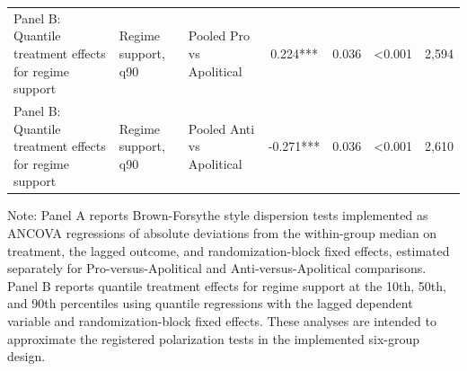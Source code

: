 \begin{table}[H]
\begin{threeparttable}
\begin{tabular}{lllcccc}
Panel B: Quantile treatment effects for regime support & Regime support, q90 & Pooled Pro vs Apolitical & 0.224*** & 0.036 & <0.001 & 2,594 \\
Panel B: Quantile treatment effects for regime support & Regime support, q90 & Pooled Anti vs Apolitical & -0.271*** & 0.036 & <0.001 & 2,610 \\
\bottomrule
\end{tabular}
\begin{tablenotes}[flushleft]
\footnotesize
\item Note: Panel A reports Brown-Forsythe style dispersion tests implemented as ANCOVA regressions of absolute deviations from the within-group median on treatment, the lagged outcome, and randomization-block fixed effects, estimated separately for Pro-versus-Apolitical and Anti-versus-Apolitical comparisons. Panel B reports quantile treatment effects for regime support at the 10th, 50th, and 90th percentiles using quantile regressions with the lagged dependent variable and randomization-block fixed effects. These analyses are intended to approximate the registered polarization tests in the implemented six-group design.
\end{tablenotes}
\end{threeparttable}
\end{table}

